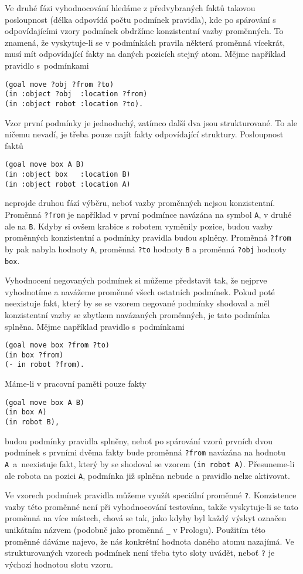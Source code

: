 Ve druhé fázi vyhodnocování hledáme z předvybraných faktů takovou posloupnost
(délka odpovídá počtu podmínek pravidla), kde po spárování s odpovídajícími
vzory podmínek obdržíme konzistentní vazby proměnných. To znamená, že
vyskytuje-li se v podmínkách pravila některá proměnná vícekrát, musí mít
odpovídající fakty na daných pozicích stejný atom. Mějme například pravidlo
s~podmínkami
\begin{verbatim}
(goal move ?obj ?from ?to)
(in :object ?obj  :location ?from)
(in :object robot :location ?to).
\end{verbatim}
Vzor první podmínky je jednoduchý, zatímco další dva jsou strukturované. To ale
ničemu nevadí, je třeba pouze najít fakty odpovídající struktury. Posloupnost
faktů
\begin{verbatim}
(goal move box A B)
(in :object box   :location B)
(in :object robot :location A)
\end{verbatim}
neprojde druhou fází výběru, neboť vazby proměnných nejsou konzistentní.
Proměnná \verb|?from| je například v první podmínce navázána na symbol \verb|A|, v
druhé ale na \verb|B|. Kdyby si ovšem krabice s robotem vyměnily pozice, budou
vazby proměnných konzistentní a podmínky pravidla budou splněny. Proměnná
\verb|?from| by pak nabyla hodnoty \verb|A|, proměnná \verb|?to| hodnoty
\verb|B| a proměnná \verb|?obj| hodnoty \verb|box|.

Vyhodnocení negovaných podmínek si můžeme představit tak, že nejprve vyhodnotíme
a navážeme proměnné všech ostatních podmínek. Pokud poté neexistuje fakt, který
by se se vzorem negované podmínky shodoval a měl konzistentní vazby se zbytkem navázaných
proměnných, je tato podmínka splněna. Mějme například pravidlo s~podmínkami
\begin{verbatim}
(goal move box ?from ?to)
(in box ?from)
(- in robot ?from).
\end{verbatim}
Máme-li v pracovní paměti pouze fakty
\begin{verbatim}
(goal move box A B)
(in box A)
(in robot B),
\end{verbatim}
budou podmínky pravidla splněny, neboť po spárování vzorů prvních dvou podmínek
s prvními dvěma fakty bude proměnná \verb|?from| navázána na hodnotu
\verb|A|~a~neexistuje fakt, který by se shodoval se vzorem \verb|(in robot A)|.
Přesuneme-li ale robota na pozici \verb|A|, podmínka již splněna nebude a
pravidlo nelze aktivovat.

Ve vzorech podmínek pravidla můžeme využít speciální proměnné \verb|?|.
Konzistence vazby této proměnné není při vyhodnocování testována, takže
vyskytuje-li se tato proměnná na více místech, chová se tak, jako kdyby byl
každý výskyt označen unikátním názvem (podobně jako proměnná \verb|_| v
Prologu). Použitím této proměnné dáváme najevo, že nás konkrétní hodnota daného
atomu nazajímá. Ve strukturovaných vzorech podmínek není třeba tyto sloty uvádět,
neboť \verb|?| je výchozí hodnotou slotu vzoru.

